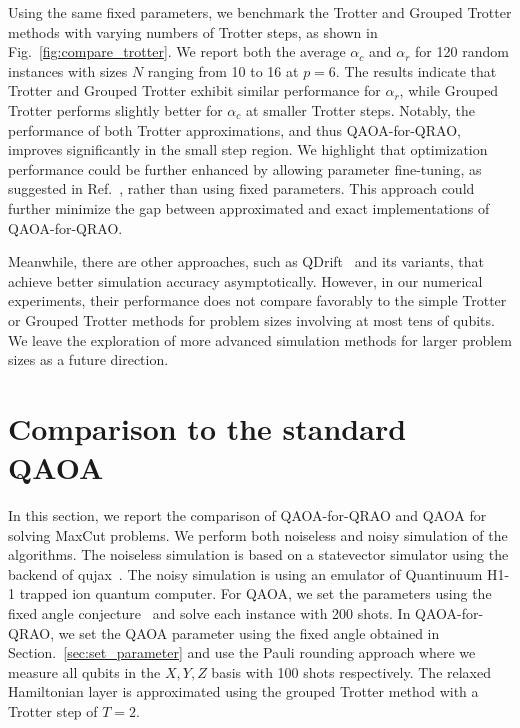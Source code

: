 \documentclass[conference,10pt]{IEEEtran}
\newcommand{\QAOAQRAO}{QAOA-for-QRAO}
\begin{document}
Using the same fixed parameters, we benchmark the Trotter and Grouped Trotter methods with varying numbers of Trotter steps, as shown in Fig.~\ref{fig:compare_trotter}. We report both the average $\alpha_c$ and $\alpha_r$ for 120 random instances with sizes $N$ ranging from 10 to 16 at $p=6$. The results indicate that Trotter and Grouped Trotter exhibit similar performance for $\alpha_r$, while Grouped Trotter performs slightly better for $\alpha_c$ at smaller Trotter steps. 
Notably, the performance of both Trotter approximations, and thus \QAOAQRAO{}, improves significantly in the small step region. We highlight that optimization performance could be further enhanced by allowing parameter fine-tuning, as suggested in Ref.~\cite{hao2024end}, rather than using fixed parameters. This approach could further minimize the gap between approximated and exact implementations of \QAOAQRAO{}.

Meanwhile, there are other approaches, such as QDrift~\cite{Campbell_2019} and its variants, that achieve better simulation accuracy asymptotically. However, in our numerical experiments, their performance does not compare favorably to the simple Trotter or Grouped Trotter methods for problem sizes involving at most tens of qubits. We leave the exploration of more advanced simulation methods for larger problem sizes as a future direction.


\section{Comparison to the standard QAOA}
In this section, we report the comparison of \QAOAQRAO{} and QAOA for solving MaxCut problems. We perform both noiseless and noisy simulation of the algorithms. The noiseless simulation is based on a statevector simulator using the backend of qujax~\cite{qujax2023}. The noisy simulation is using an emulator of Quantinuum H1-1 trapped ion quantum computer. For QAOA, we set the parameters using the fixed angle conjecture~\cite{wurtz2021fixed} and solve each instance with 200 shots. In \QAOAQRAO{}, we set the QAOA parameter using the fixed angle obtained in Section.~\ref{sec:set_parameter} and use the Pauli rounding approach where we measure all qubits in the $X, Y, Z$ basis with 100 shots respectively. The relaxed Hamiltonian layer is approximated using the grouped Trotter method with a Trotter step of $T=2$. 
\end{document}
